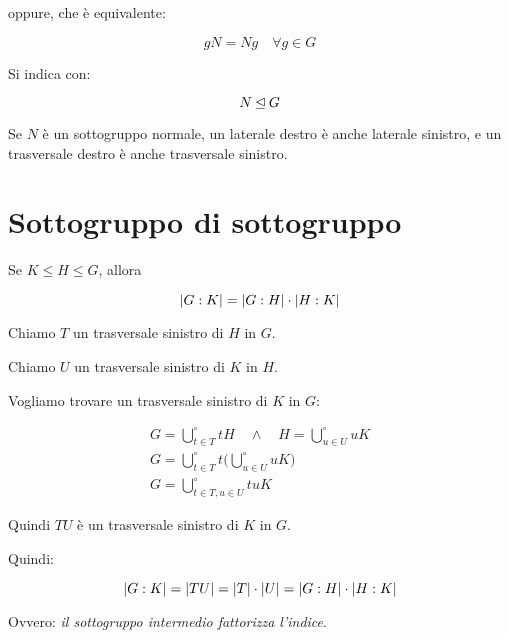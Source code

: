 oppure, che è equivalente:

\begin{equation}
	gN = Ng \quad \forall g \in G
\end{equation}

Si indica con:

\begin{equation}
	N \unlhd G
\end{equation}

Se $N$ è un sottogruppo normale, un laterale destro è anche laterale sinistro, e un trasversale destro è anche trasversale sinistro.

\section{Sottogruppo di sottogruppo}

\begin{teorema}
	\label{thr:fattorizzazione_indici}
	Se $K \le H \le G$, allora
	
	\begin{equation}
		\lvert G:K \rvert = \lvert G:H \rvert \cdot \lvert H:K \rvert
	\end{equation} 
\end{teorema}
\begin{dimostrazione}
	Chiamo $T$ un trasversale sinistro di $H$ in $G$.
	
	Chiamo $U$ un trasversale sinistro di $K$ in $H$.
	
	Vogliamo trovare un trasversale sinistro di $K$ in $G$:
	
	\begin{gather}
		G = \bigcup^\circ_{t \in T} tH \quad\land\quad H = \bigcup^\circ_{u \in U} uK \\
		G = \bigcup^\circ_{t \in T} t \biggl(\bigcup^\circ_{u \in U} uK\biggr) \\
		G = \bigcup^\circ_{t \in T, u \in U} tuK
	\end{gather}

	Quindi $TU$ è un trasversale sinistro di $K$ in $G$.
	
	Quindi:
	
	\begin{equation}
		\lvert G:K \rvert = \lvert TU \rvert = \lvert T \rvert \cdot \lvert U \rvert = \lvert G:H \rvert \cdot \lvert H:K \rvert
	\end{equation}

	Ovvero: \emph{il sottogruppo intermedio fattorizza l'indice}.
\end{dimostrazione}

